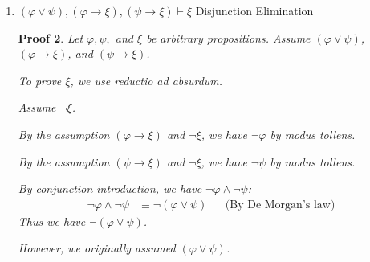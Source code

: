 \documentclass[12pt]{article}
\theoremstyle{proofstyle}
\newtheorem*{proof*}{Proof}
\let\oldquote\quote
\let\oldendquote\endquote
\renewenvironment{quote}
    {\oldquote\setlength{\parskip}{0.2em}}
    {\oldendquote}
\begin{document}
\begin{enumerate}[left=0pt, itemsep=2em, parsep=1em]
\begin{enumerate}[label=(\alph*), itemsep=1.5em, leftmargin=2em]
\begin{proof*}
    To prove $\varphi \vee \psi$, we use reductio ad absurdum.

    \begin{quote}
    
    Assume $\neg(\varphi \vee \psi)$.
    \begin{align*}
    \neg(\varphi \vee \psi) \equiv \neg\varphi \wedge \neg\psi && \text{(By De Morgan's law)}
    \end{align*}
    We know have $\neg\varphi \wedge \neg\psi$.
    
    By conjunction elimination, we have $\neg\varphi$.
    
    However, we originally assumed $\varphi$.

    Thus we have both $\varphi$ and $\neg\varphi$, which is a contradiction.

    \end{quote}
    
    Therefore, by reductio ad absurdum, $\varphi \vee \psi$ holds. \qed
\end{proof*}

\newpage

\item $(\varphi \vee \psi), (\varphi \to \xi), (\psi \to \xi) \vdash \xi$ \hfill Disjunction Elimination

\begin{proof*}
    Let $\varphi, \psi,$ and $\xi$ be arbitrary propositions. Assume $(\varphi \vee \psi)$, $(\varphi \to \xi)$, and $(\psi \to \xi)$.
    
    To prove $\xi$, we use reductio ad absurdum.

    \begin{quote}
    
    Assume $\neg\xi$.
    
    By the assumption $(\varphi \to \xi)$ and $\neg\xi$, we have $\neg\varphi$ by modus tollens.
    
    By the assumption $(\psi \to \xi)$ and $\neg\xi$, we have $\neg\psi$ by modus tollens.
    
    By conjunction introduction, we have $\neg\varphi \wedge \neg\psi$: 
    \begin{align*}
        \neg\varphi \wedge \neg\psi &\equiv \neg(\varphi \vee \psi) && \text{(By De Morgan's law)}
    \end{align*}        
    Thus we have $\neg(\varphi \vee \psi)$.
    
    However, we originally assumed $(\varphi \vee \psi)$.
    

\end{quote}
\end{proof*}
\end{enumerate}
\end{enumerate}
\end{document}
